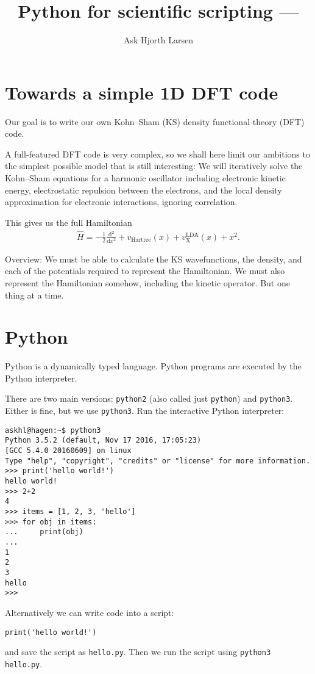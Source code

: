 \documentclass{article}
\title{Python for scientific scripting --- }
\author{Ask Hjorth Larsen}
\newcommand{\diff}[2]{\frac{\mathrm d #1}{\mathrm d #2}}
\newcommand{\Ha}[0]{\mathrm{Hartree}}
\begin{document}
\section{Towards a simple 1D DFT code}

Our goal is to write our own Kohn--Sham (KS) density functional theory
(DFT) code.


A full-featured DFT code is very complex, so we shall here limit our ambitions
to the simplest possible model that is still interesting:
We will iteratively solve the Kohn--Sham
equations for a harmonic oscillator including electronic kinetic
energy, electrostatic repulsion between the electrons, and the
local density approximation for electronic interactions, ignoring correlation.

This gives us the full Hamiltonian
\begin{align}
\hat H = -\frac12 \diff{^2}{x^2} + v_\Ha(x) + v_{\mathrm X}^{\mathrm{LDA}}(x) + x^2.
\end{align}

Overview: We must be able to calculate the KS wavefunctions, the
density, and each of the potentials required to represent the
Hamiltonian.  We must also represent the Hamiltonian somehow,
including the kinetic operator.  But one thing at a time.

\section{Python}

Python is a dynamically typed language.  Python programs are executed
by the Python interpreter.

There are two main versions:
\texttt{python2} (also called just \texttt{python}) and \texttt{python3}.
Either is fine, but we use \texttt{python3}.
Run the interactive Python interpreter:

\begin{lstlisting}
askhl@hagen:~$ python3
Python 3.5.2 (default, Nov 17 2016, 17:05:23)
[GCC 5.4.0 20160609] on linux
Type "help", "copyright", "credits" or "license" for more information.
>>> print('hello world!')
hello world!
>>> 2+2
4
>>> items = [1, 2, 3, 'hello']
>>> for obj in items:
...     print(obj)
...
1
2
3
hello
>>>
\end{lstlisting}

Alternatively we can write code into a script:
\begin{lstlisting}
print('hello world!')
\end{lstlisting}
and save the script as \texttt{hello.py}.  Then we run the script using
\texttt{python3 hello.py}.
\end{document}
